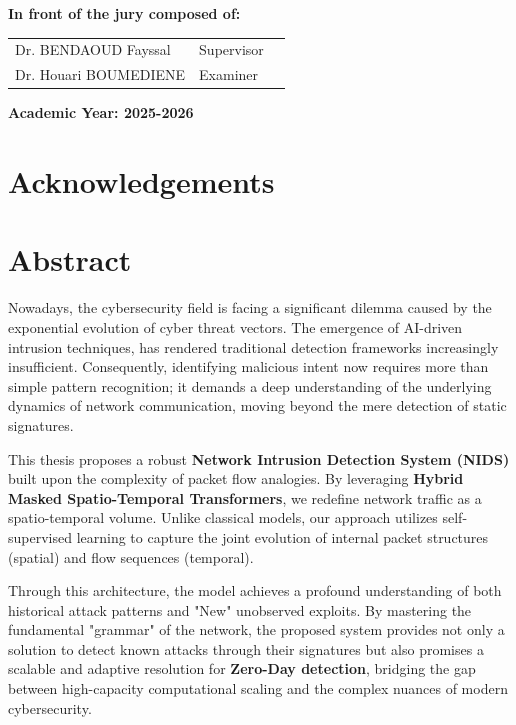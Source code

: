 \documentclass[12pt, a4paper]{report}
\begin{document}
\begin{titlepage}
\begin{center}
        \vspace{1.5cm}
        \textbf{In front of the jury composed of:}\\[0.5cm]
        \begin{tabular}{l l l}
            Dr. BENDAOUD Fayssal & Supervisor & \\
            Dr. Houari  BOUMEDIENE &   Examiner & \\
        \end{tabular}
        
        \vfill
        \textbf{Academic Year: 2025-2026 }
    \end{center}
\end{titlepage}

\part*{Acknowledgements}



\newpage

\part*{Abstract}


Nowadays, the cybersecurity field is facing a significant dilemma caused by the exponential evolution of cyber threat vectors. The emergence of AI-driven intrusion techniques, has rendered traditional detection frameworks increasingly insufficient. Consequently, identifying malicious intent now requires more than simple pattern recognition; it demands a deep understanding of the underlying dynamics of network communication, moving beyond the mere detection of static signatures.

This thesis proposes a robust \textbf{Network Intrusion Detection System (NIDS)} built upon the complexity of packet flow analogies. By leveraging \textbf{Hybrid Masked Spatio-Temporal Transformers}, we redefine network traffic as a spatio-temporal volume. Unlike classical models, our approach utilizes self-supervised learning to capture the joint evolution of internal packet structures (spatial) and flow sequences (temporal). 

Through this architecture, the model achieves a profound understanding of both historical attack patterns and "New" unobserved exploits. By mastering the fundamental "grammar" of the network, the proposed system provides not only a solution to detect known attacks through their signatures but also promises a scalable and adaptive resolution for \textbf{Zero-Day detection}, bridging the gap between high-capacity computational scaling and the complex nuances of modern cybersecurity.
\end{document}
